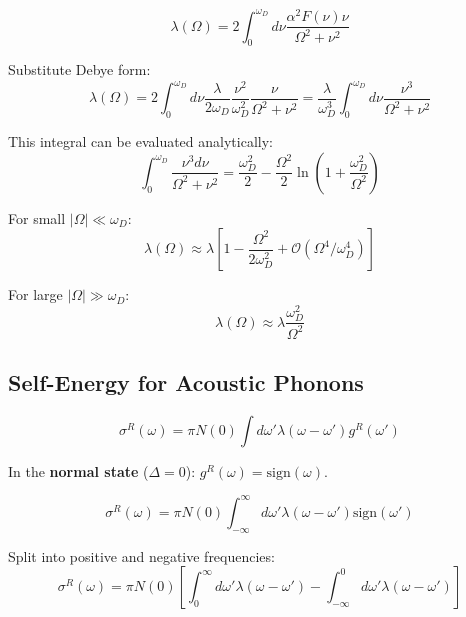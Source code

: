 \documentclass[12pt]{article}
\begin{document}
\begin{equation}
\lambda(\Omega) = 2\int_0^{\omega_D} d\nu \frac{\alpha^2F(\nu) \nu}{\Omega^2 + \nu^2}
\end{equation}

Substitute Debye form:
\begin{equation}
\lambda(\Omega) = 2\int_0^{\omega_D} d\nu \frac{\lambda}{2\omega_D} \frac{\nu^2}{\omega_D^2} \frac{\nu}{\Omega^2 + \nu^2}
= \frac{\lambda}{\omega_D^3} \int_0^{\omega_D} d\nu \frac{\nu^3}{\Omega^2 + \nu^2}
\end{equation}

This integral can be evaluated analytically:
\begin{equation}
\int_0^{\omega_D} \frac{\nu^3 d\nu}{\Omega^2 + \nu^2} = \frac{\omega_D^2}{2} - \frac{\Omega^2}{2}\ln\left(1 + \frac{\omega_D^2}{\Omega^2}\right)
\end{equation}

For small $|\Omega| \ll \omega_D$:
\begin{equation}
\boxed{
\lambda(\Omega) \approx \lambda \left[1 - \frac{\Omega^2}{2\omega_D^2} + \mathcal{O}(\Omega^4/\omega_D^4)\right]
}
\end{equation}

For large $|\Omega| \gg \omega_D$:
\begin{equation}
\lambda(\Omega) \approx \lambda \frac{\omega_D^2}{\Omega^2}
\end{equation}

\subsection{Self-Energy for Acoustic Phonons}

\begin{equation}
\sigma^R(\omega) = \pi N(0) \int d\omega' \lambda(\omega - \omega') g^R(\omega')
\end{equation}

In the \textbf{normal state} ($\Delta = 0$): $g^R(\omega) = \text{sign}(\omega)$.

\begin{equation}
\sigma^R(\omega) = \pi N(0) \int_{-\infty}^{\infty} d\omega' \lambda(\omega - \omega') \text{sign}(\omega')
\end{equation}

Split into positive and negative frequencies:
\begin{equation}
\sigma^R(\omega) = \pi N(0) \left[\int_0^{\infty} d\omega' \lambda(\omega - \omega') - \int_{-\infty}^0 d\omega' \lambda(\omega - \omega')\right]
\end{equation}
\end{document}
